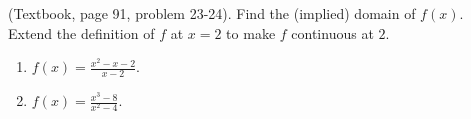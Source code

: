 (Textbook, page 91, problem 23-24). Find the (implied) domain of $f(x)$. Extend the definition of $f$ at $x=2$ to make $f$ continuous at $2$.
\begin{multicols}{2}
\begin{enumerate}
\item $f(x)=\frac{x^2-x-2}{x-2}$.
\item $f(x)=\frac{x^3-8}{x^2-4}$.
\end{enumerate}
\end{multicols}